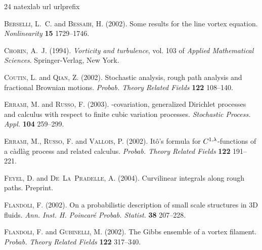\documentclass[a4paper,12pt,reqno]{amsart}
\begin{document}
%
%
\begin{thebibliography}{24}
\expandafter\ifx\csname natexlab\endcsname\relax\def\natexlab#1{#1}\fi
\expandafter\ifx\csname url\endcsname\relax
  \def\url#1{\texttt{#1}}\fi
\expandafter\ifx\csname urlprefix\endcsname\relax\def\urlprefix{URL }\fi

\textsc{Berselli, L.~C.} and \textsc{Bessaih, H.} (2002).
\newblock Some results for the line vortex equation.
\newblock \textit{Nonlinearity} \textbf{15} 1729--1746.

\textsc{Chorin, A.~J.} (1994).
\newblock \textit{Vorticity and turbulence}, vol. 103 of \textit{Applied
  Mathematical Sciences}.
\newblock Springer-Verlag, New York.

\textsc{Coutin, L.} and \textsc{Qian, Z.} (2002).
\newblock Stochastic analysis, rough path analysis and fractional {B}rownian
  motions.
\newblock \textit{Probab. Theory Related Fields} \textbf{122} 108--140.

\textsc{Errami, M.} and \textsc{Russo, F.} (2003).
-covariation, generalized {D}irichlet processes and calculus
  with respect to finite cubic variation processes.
\newblock \textit{Stochastic Process. Appl.} \textbf{104} 259--299.

\textsc{Errami, M.}, \textsc{Russo, F.} and \textsc{Vallois, P.} (2002).
\newblock It\^o's formula for {$C\sp {1,\lambda}$}-functions of a c\`adl\`ag
  process and related calculus.
\newblock \textit{Probab. Theory Related Fields} \textbf{122} 191--221.

\textsc{Feyel, D.} and \textsc{De~La~Pradelle, A.} (2004).
\newblock Curvilinear integrals along rough paths.
\newblock Preprint.

\textsc{Flandoli, F.} (2002).
\newblock On a probabilistic description of small scale structures in 3{D}
  fluids.
\newblock \textit{Ann. Inst. H. Poincar\'e Probab. Statist.} \textbf{38}
  207--228.

\textsc{Flandoli, F.} and \textsc{Gubinelli, M.} (2002).
\newblock The {G}ibbs ensemble of a vortex filament.
\newblock \textit{Probab. Theory Related Fields} \textbf{122} 317--340.


\end{thebibliography}
\end{document}
